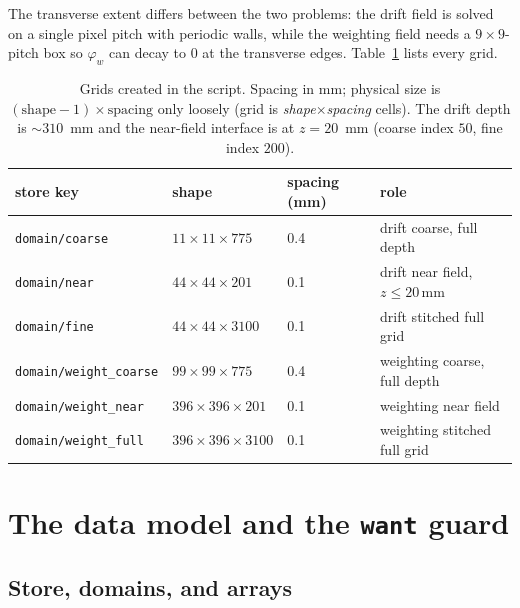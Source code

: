 \documentclass[11pt]{article}
\newcommand{\key}[1]{\texttt{#1}}
\begin{document}
The transverse extent differs between the two problems: the drift field
is solved on a single pixel pitch with periodic walls, while the weighting
field needs a $9\times9$-pitch box so $\varphi_w$ can decay to $0$ at the
transverse edges.  Table~\ref{tab:domains} lists every grid.

\begin{table}[h]
\centering
\caption{Grids created in the script. Spacing in mm; physical size is
$(\text{shape}-1)\times\text{spacing}$ only loosely (grid is
\textit{shape}$\times$\textit{spacing} cells). The drift depth is
$\sim310$~mm and the near-field interface is at $z=20$~mm
(coarse index $50$, fine index $200$).}
\label{tab:domains}
\begin{tabular}{@{}llll@{}}
\toprule
store key & shape & spacing (mm) & role \\
\midrule
\key{domain/coarse}        & $11\times11\times775$    & 0.4 & drift coarse, full depth \\
\key{domain/near}          & $44\times44\times201$    & 0.1 & drift near field, $z\le20$\,mm \\
\key{domain/fine}          & $44\times44\times3100$   & 0.1 & drift stitched full grid \\
\key{domain/weight\_coarse}& $99\times99\times775$    & 0.4 & weighting coarse, full depth \\
\key{domain/weight\_near}  & $396\times396\times201$  & 0.1 & weighting near field \\
\key{domain/weight\_full}  & $396\times396\times3100$ & 0.1 & weighting stitched full grid \\
\bottomrule
\end{tabular}
\end{table}

\section{The data model and the \texttt{want} guard}

\subsection{Store, domains, and arrays}
\end{document}
